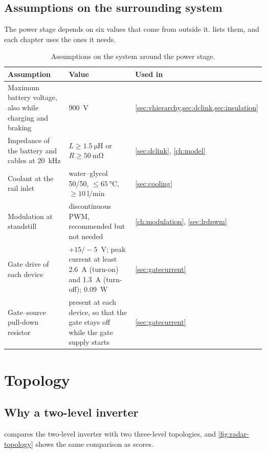 \subsection{Assumptions on the surrounding system}

The power stage depends on six values that come from outside it.
 lists them, and each chapter uses the ones it needs.

\begin{table}[H]
\centering
\caption{Assumptions on the system around the power stage.}
\label{tab:sysassume}
\small
\zebra
\begin{tabularx}{\textwidth}{L{0.3\textwidth}YL{0.24\textwidth}}
\toprule
Assumption & Value & Used in \\
\midrule
Maximum battery voltage, also while charging and braking & \SI{900}{\volt} & \cref{sec:vhierarchy,sec:dclink,sec:insulation} \\
Impedance of the battery and cables at \SI{20}{\kilo\hertz} & $L \geq \SI{1.5}{\micro\henry}$ or $R \geq \SI{50}{\milli\ohm}$ & \cref{sec:dclink}, \cref{ch:model} \\
Coolant at the rail inlet & water--glycol 50/50, $\leq\SI{65}{\celsius}$, $\geq\SI{10}{\litre\per\minute}$ & \cref{sec:cooling} \\
Modulation at standstill & discontinuous PWM, recommended but not needed & \cref{ch:modulation}, \cref{sec:lrdpwm} \\
Gate drive of each device & $+15/-5$~V; peak current at least \SI{2.6}{\ampere} (turn-on) and \SI{1.3}{\ampere} (turn-off); \SI{0.09}{\watt} & \cref{sec:gatecurrent} \\
Gate--source pull-down resistor & present at each device, so that the gate stays off while the gate supply starts & \cref{sec:gatecurrent} \\
\bottomrule
\end{tabularx}
\end{table}

\section{Topology}

\subsection{Why a two-level inverter}

 compares the two-level inverter with two three-level
topologies, and \cref{fig:radar-topology} shows the same comparison as
scores.

